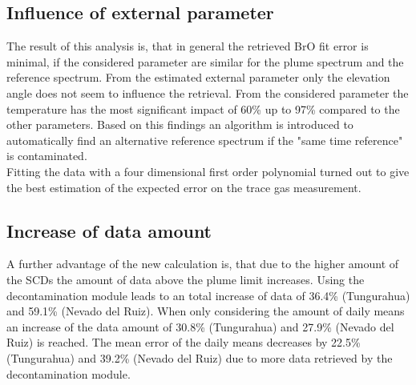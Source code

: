 \documentclass  [
  paper    = a4,
  BCOR     = 10mm,
  twoside,
  fontsize = 12pt,
  fleqn,
  toc      = bibnumbered,
  toc      = listofnumbered,
  numbers  = noendperiod,
  headings = normal,
  listof   = leveldown,
  version  = 3.03
]                                       {scrreprt}
\begin{document}
	\subsection*{Influence of external parameter} 
	The result of this analysis is, that in general the retrieved BrO fit error is minimal, if the considered parameter are similar for the plume spectrum and the reference spectrum. From the estimated external parameter only the elevation angle does not seem to influence the retrieval. From the considered parameter the temperature has the most significant impact of 60\% up to 97\% compared to the other parameters.
	Based on this findings an algorithm is introduced to automatically find an alternative reference spectrum if the "same time reference" is contaminated.\\
	Fitting the data with a four dimensional first order polynomial turned out to give the best estimation of the expected error on the trace gas measurement.
	\subsection*{Increase of data amount} 
	A further advantage of the new calculation is, that due to the higher amount of the  SCDs the amount of data above the plume limit increases. Using the decontamination module leads to an total increase of data of 36.4\% (Tungurahua) and 59.1\% (Nevado del Ruiz). When only considering the amount of daily means an increase of the data amount of 30.8\% (Tungurahua) and 27.9\% (Nevado del Ruiz) is reached. The mean error of the daily means decreases by 22.5\% (Tungurahua) and 39.2\% (Nevado del Ruiz) due to more data retrieved by the decontamination module.
\end{document}

